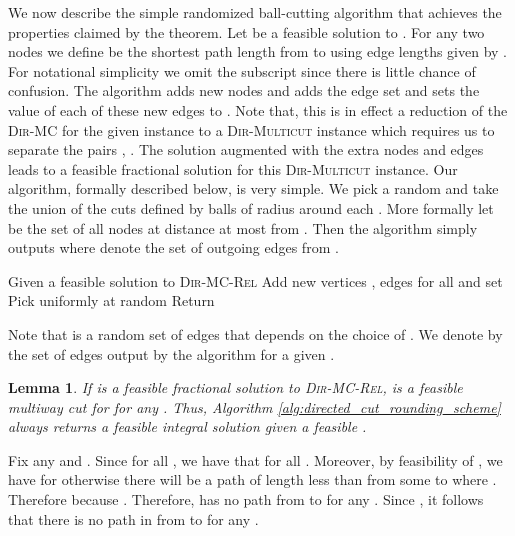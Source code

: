 \documentclass[11pt]{article}
\newtheorem{lemma}{Lemma}[section]
\renewenvironment{proof}{\vspace{-0.1in}\noindent{\bf Proof:}}{\hspace*{\fill}\par}
\def\DirMC{\textsc{Dir-MC}\xspace}
\def\DirMCRel{\textsc{Dir-MC-Rel}\xspace}
\def\DirMulticut{\textsc{Dir-Multicut}\xspace}
\begin{document}
We now describe the simple randomized ball-cutting algorithm that
achieves the properties claimed by the theorem. Let  be a
feasible solution to . For any two nodes  we
define  be the shortest path length from  to  using
edge lengths given by . For notational simplicity we omit the
subscript  since there is little chance of confusion. The algorithm
adds new nodes  and adds the edge set  and sets the  value of each of these new edges to
. Note that, this is in effect a reduction of the \DirMC for the
given instance to a \DirMulticut instance which requires us to
separate the pairs , . The solution 
augmented with the extra nodes and edges leads to a feasible
fractional solution for this \DirMulticut instance. Our algorithm,
formally described below, is very simple. We pick a random  and take the union of the cuts defined by balls of radius
 around each . More formally let  be the set of
all nodes at distance at most  from .  Then the algorithm simply
outputs  where 
denote the set of outgoing edges from .

\begin{algorithm}
	\caption{Rounding for \DirMC}
	\label{alg:directed_cut_rounding_scheme}
	\begin{algorithmic}[1]
		\STATE Given a feasible solution 
                to \DirMCRel
		\STATE Add new vertices , edges  
              for all  and set  
		\STATE Pick  uniformly at random
\STATE 
		\STATE Return 
	\end{algorithmic}
\end{algorithm}

Note that  is a random set of edges that depends on the choice of
. We denote by  the set of edges output by the
algorithm for a given .

\begin{lemma}
  \label{lem:dir-feasibility}
  If  is a feasible fractional solution to \DirMCRel, 
  is a feasible multiway cut for  for any . Thus, Algorithm \ref{alg:directed_cut_rounding_scheme}
  always returns a feasible integral solution given a feasible .
\end{lemma}
\begin{proof}
  Fix any  and . Since
   for all , we have that  for all . Moreover, by feasibility of
  , we have  for otherwise there will be a path
  of length less than  from some  to  where .
  Therefore  because .
  Therefore,  has no path from  to
   for any . Since , it follows that there is no path in  from  to  for any .
\end{proof}
\end{document}
